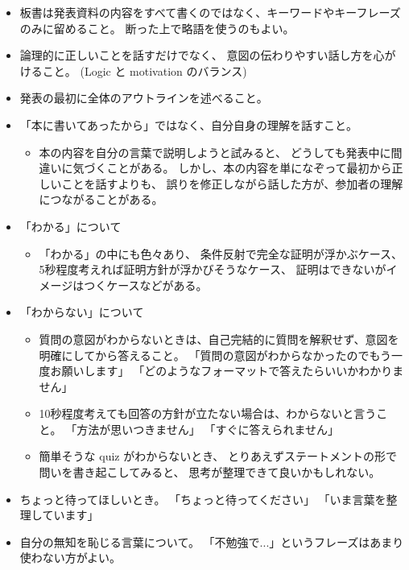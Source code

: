 \documentclass[report, notitlepage]{jlreq}
\begin{document}
\begin{itemize}
    \item 板書は発表資料の内容をすべて書くのではなく、キーワードやキーフレーズのみに留めること。
        断った上で略語を使うのもよい。
    \item 論理的に正しいことを話すだけでなく、
        意図の伝わりやすい話し方を心がけること。
        (Logic と motivation のバランス)
    \item 発表の最初に全体のアウトラインを述べること。
    \item 「本に書いてあったから」ではなく、自分自身の理解を話すこと。
        \begin{itemize}
            \item 本の内容を自分の言葉で説明しようと試みると、
                どうしても発表中に間違いに気づくことがある。
                しかし、本の内容を単になぞって最初から正しいことを話すよりも、
                誤りを修正しながら話した方が、参加者の理解につながることがある。
        \end{itemize}
    \item 「わかる」について
        \begin{itemize}
            \item 「わかる」の中にも色々あり、
                条件反射で完全な証明が浮かぶケース、
                5秒程度考えれば証明方針が浮かびそうなケース、
                証明はできないがイメージはつくケースなどがある。
        \end{itemize}
    \item 「わからない」について
        \begin{itemize}
            \item 質問の意図がわからないときは、自己完結的に質問を解釈せず、意図を明確にしてから答えること。
                「質問の意図がわからなかったのでもう一度お願いします」
                「どのようなフォーマットで答えたらいいかわかりません」
            \item 10秒程度考えても回答の方針が立たない場合は、わからないと言うこと。
                「方法が思いつきません」
                「すぐに答えられません」
            \item 簡単そうな quiz がわからないとき、
                とりあえずステートメントの形で問いを書き起こしてみると、
                思考が整理できて良いかもしれない。
        \end{itemize}
    \item ちょっと待ってほしいとき。
        「ちょっと待ってください」
        「いま言葉を整理しています」
    \item 自分の無知を恥じる言葉について。
        「不勉強で...」というフレーズはあまり使わない方がよい。
\end{itemize}
\end{document}
